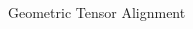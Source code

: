 \begin{frame}{Geometric Tensor Alignment}
\begin{columns}
\begin{column}{.55\textwidth}
\begin{figure}
      \end{figure}
    \end{column}
  \end{columns}
\end{frame}







